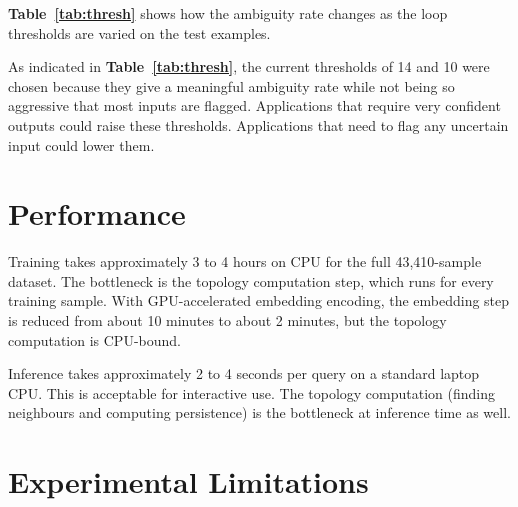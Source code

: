 \textbf{Table~\ref{tab:thresh}} shows how the ambiguity rate changes as the loop thresholds are varied
on the test examples.

\begin{table}[H]
\centering
\caption{Effect of Threshold Configurations on Ambiguity Rate}
\label{tab:thresh}
\end{table}

As indicated in \textbf{Table~\ref{tab:thresh}}, the current thresholds of 14 and 10 were chosen because
they give a meaningful ambiguity rate while not being so aggressive that most inputs are flagged.
Applications that require very confident outputs could raise these thresholds. Applications that
need to flag any uncertain input could lower them.

\section{Performance}

Training takes approximately 3 to 4 hours on CPU for the full 43,410-sample dataset. The
bottleneck is the topology computation step, which runs for every training sample. With
GPU-accelerated embedding encoding, the embedding step is reduced from about 10 minutes to
about 2 minutes, but the topology computation is CPU-bound.

Inference takes approximately 2 to 4 seconds per query on a standard laptop CPU. This is
acceptable for interactive use. The topology computation (finding neighbours and computing
persistence) is the bottleneck at inference time as well.

\section{Experimental Limitations}

